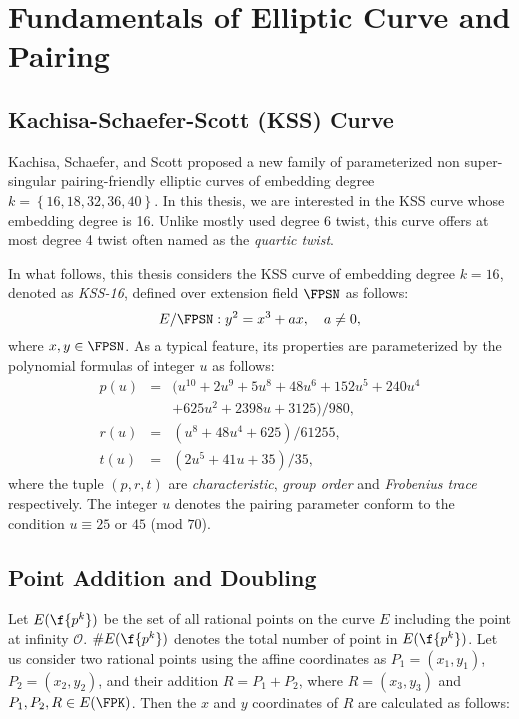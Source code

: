 \section{Fundamentals of Elliptic Curve and Pairing}\label{sec:1}
\subsection{Kachisa-Schaefer-Scott (KSS) Curve \cite{EPRINT:KacSchSco07}}
Kachisa, Schaefer, and Scott proposed a new family of  parameterized non super-singular pairing-friendly elliptic curves of embedding degree $k = \left\lbrace 16, 18, 32, 36, 40\right\rbrace$.
In this thesis, we are interested in the KSS curve whose embedding degree is 16. 
Unlike mostly used degree 6 twist, this curve offers at most degree 4 twist often named as the \textit{quartic twist}.

In what follows, this thesis considers  the KSS curve of embedding degree $k =16$, denoted as \textit{KSS-16}, defined over extension field $\FPSN$ as follows:
\begin{equation}\label{eq:KSS_16}
E/\FPSN:y^2=x^3+ax, \quad \mbox{$a \neq 0$},
\end{equation}
where $x,y \in \FPSN$. 
As a typical feature, its properties are parameterized by the polynomial formulas of integer $u$ as follows:
\begin{subequations}
	\begin{eqnarray}
	p(u) &= & (u^{10} +2u^9 +5u^8 +48u^6 +152u^5 +240u^4   \nonumber \\ 
	&& +625u^2 +2398u +3125)/980,  \\\label{eq:kss_16_char}
	r(u) &= & (u^8 +48u^4 +625)/61255, \label{eq:kss_16_degree}  \\
	t(u) &=& (2u^5 +41u+35)/35, \label{eq:kss_16_trace} 
	\end{eqnarray}
\end{subequations} 
where the tuple $(p,r,t)$ are \textit{characteristic}, \textit{group order} and \textit{Frobenius trace} respectively.
The integer  $u$  denotes the pairing parameter conform to the condition $u \equiv 25$ or $45$ (mod $70$). 

\subsection{Point Addition and Doubling}
Let $E(\f{p^k})$ be the set of all rational points on the curve $E$ including the point at infinity $\mathcal{O}$.
$\#E(\f{p^k})$ denotes the total number of point in $E(\f{p^k})$.
Let us consider two rational points using the affine coordinates as $P_1= (x_1, y_1)$, $P_2 = (x_2, y_2)$, and their addition $R = P_1 + P_2$, where $\textit{R} = (x_3, y_3)$ and $P_1, P_2, R \in E(\FPK)$. Then the $x$ and $y$ coordinates of $R$ are calculated as follows:

